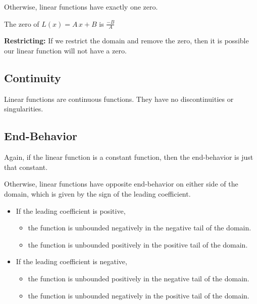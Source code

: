 \documentclass{ximera}
\begin{document}
Otherwise, linear functions have exactly one zero. 

The zero of $L(x) = A \, x + B $ is $\frac{-B}{A}$

\textbf{Restricting:} If we restrict the domain and remove the zero, then it is possible our linear function will not have a zero.










\subsection*{Continuity}

Linear functions are continuous functions.  They have no discontinuities or singularities. 






\subsection*{End-Behavior}


Again, if the linear function is a constant function, then the end-behavior is just that constant. 



Otherwise, linear functions have opposite end-behavior on either side of the domain, which is given by the sign of the leading coefficient. 


\begin{itemize}
     \item If the leading coefficient is positive,
     \begin{itemize}
          \item the function is unbounded negatively in the negative tail of the domain.
          \item the function is unbounded positively in the positive tail of the domain. 
     \end{itemize}




     \item If the leading coefficient is negative,
     \begin{itemize}
          \item the function is unbounded positively in the negative tail of the domain.
          \item the function is unbounded negatively in the positive tail of the domain.
     \end{itemize}
\end{itemize}
\end{document}
